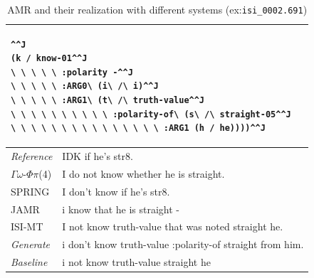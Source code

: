 \documentclass[12pt]{article}
\newcommand{\systeme}[1]{\textsc{#1}}
\newcommand{\gophipy}{$\Gamma\omega$-$\Phi\pi$}
\newcommand{\jamr}{\systeme{JAMR}}
\newcommand{\isimt}{\systeme{ISI-MT}}
\newcommand{\spring}{\systeme{SPRING}}
\begin{document}
\noindent
\begin{table}[ht]
\begin{tabular}{|p{1in}|p{5.25in}|}%
\hline
\multicolumn{2}{|p{6in}|}{
\begin{lstlisting}^^J
(k / know-01^^J
\ \ \ \ \ :polarity -^^J
\ \ \ \ \ :ARG0\ (i\ /\ i)^^J
\ \ \ \ \ :ARG1\ (t\ /\ truth-value^^J
\ \ \ \ \ \ \ \ \ \ :polarity-of\ (s\ /\ straight-05^^J
\ \ \ \ \ \ \ \ \ \ \ \ \ \ \ :ARG1 (h / he))))^^J
\end{lstlisting}
}\\\hline
\emph{Reference}&   IDK if he's str8.\\\hline
\gophipy{}(4)&I do not know whether he is straight. \\\hline
\spring{}&I don't know if he's str8.\\\hline
\jamr{}&i know that he is straight -\\\hline
\isimt{}&I not know truth-value that was noted straight he.\\\hline
\emph{Generate}& i don't know truth-value :polarity-of straight from him.\\\hline
\emph{Baseline}&i not know truth-value straight he\\
\hline
\end{tabular}
\caption{AMR and their realization with different systems (ex:\texttt{isi\_0002.691})}
\label{eX:isi_0002.691}
\end{table}
\end{document}
